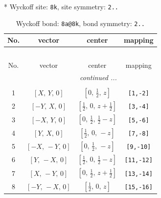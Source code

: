\documentclass[fleqn,8pt]{jsarticle}
\begin{document}
* Wyckoff site: {\tt 8k}, site symmetry: {\tt 2..}
\renewcommand{\arraystretch}{1.2}
\begin{longtable}{cccc}
\caption{Wyckoff bond: {\tt 8a@8k}, bond symmetry: {\tt 2..}}
 \\
 \hline \hline
No. & vector & center & mapping \\ \hline \endfirsthead

\multicolumn{3}{l}{\tablename\ \thetable{}} \\
 \hline \hline
No. & vector & center & mapping \\ \hline \endhead

 \hline \hline
\multicolumn{3}{r}{\footnotesize\it continued ...} \\ \endfoot

 \hline \hline
\multicolumn{3}{r}{} \\ \endlastfoot

1 & $\left[ X,\, Y,\, 0 \right]$ & $\left[ 0,\, \frac{1}{2},\, z \right]$ & {\tt [1,-2]} \\ \hline
2 & $\left[ - Y,\, X,\, 0 \right]$ & $\left[ \frac{1}{2},\, 0,\, z + \frac{1}{2} \right]$ & {\tt [3,-4]} \\ \hline
3 & $\left[ - X,\, Y,\, 0 \right]$ & $\left[ 0,\, \frac{1}{2},\, \frac{1}{2} - z \right]$ & {\tt [5,-6]} \\ \hline
4 & $\left[ Y,\, X,\, 0 \right]$ & $\left[ \frac{1}{2},\, 0,\, - z \right]$ & {\tt [7,-8]} \\ \hline
5 & $\left[ - X,\, - Y,\, 0 \right]$ & $\left[ 0,\, \frac{1}{2},\, - z \right]$ & {\tt [9,-10]} \\ \hline
6 & $\left[ Y,\, - X,\, 0 \right]$ & $\left[ \frac{1}{2},\, 0,\, \frac{1}{2} - z \right]$ & {\tt [11,-12]} \\ \hline
7 & $\left[ X,\, - Y,\, 0 \right]$ & $\left[ 0,\, \frac{1}{2},\, z + \frac{1}{2} \right]$ & {\tt [13,-14]} \\ \hline
8 & $\left[ - Y,\, - X,\, 0 \right]$ & $\left[ \frac{1}{2},\, 0,\, z \right]$ & {\tt [15,-16]} \\
\end{longtable}
\renewcommand{\arraystretch}{1.2}
\end{document}

